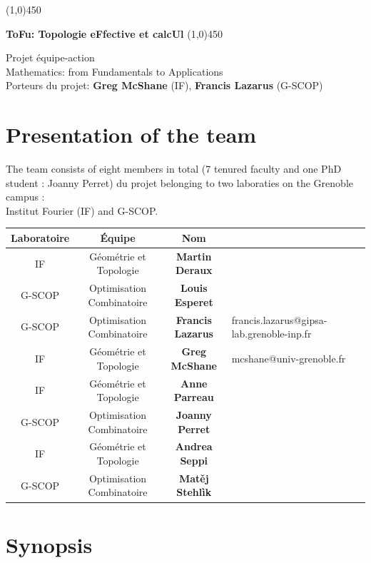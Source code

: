\documentclass[14pt,fleqn]{article}
\begin{document}
\begin{center}
\line(1,0){450}

\vspace{0.2in}
{\huge \bf ToFu: Topologie eFfective et calcUl}
\vspace{0.2in}
\line(1,0){450}
\bigskip

Projet équipe-action  \\
Mathematics: from Fundamentals to Applications
\\
Porteurs du projet:  {\bf Greg McShane} (IF),  {\bf Francis Lazarus} (G-SCOP)
\end{center}


\tableofcontents

\newpage

\section{Presentation of the team}
The team consists of eight members in total (7 tenured faculty and one PhD student : Joanny Perret) du projet belonging to two  laboraties on the Grenoble campus : \\
Institut Fourier (IF) and G-SCOP.

\smallskip
\vspace{.5cm}
\begin{center}
\begin{tabular}[h]{|c|c|c|l|l|}
  \hline
 Laboratoire & Équipe & Nom \\
\hline \hline
IF & Géométrie et Topologie & {\bf Martin Deraux} &\\
\hline
G-SCOP & Optimisation Combinatoire & {\bf Louis Esperet}& \\
\hline
G-SCOP & Optimisation Combinatoire & {\bf Francis Lazarus}& 
francis.lazarus@gipsa-lab.grenoble-inp.fr\\
\hline
IF & Géométrie et Topologie & {\bf Greg McShane}&
mcshane@univ-grenoble.fr \\
\hline
IF & Géométrie et Topologie & {\bf Anne Parreau}& \\
\hline
G-SCOP & Optimisation Combinatoire & {\bf Joanny Perret}& \\
\hline
IF & Géométrie et Topologie & {\bf Andrea Seppi}& \\
\hline
G-SCOP & Optimisation Combinatoire & {\bf Mat\v{e}j Stehlìk}& \\
\hline
\end{tabular}
\end{center}

\section{Synopsis}
\end{document}
